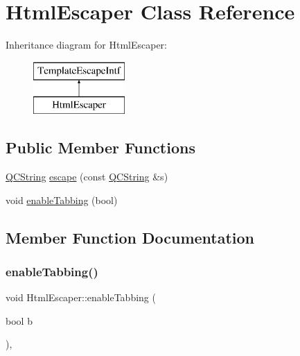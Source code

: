 \hypertarget{class_html_escaper}{}\section{Html\+Escaper Class Reference}
\label{class_html_escaper}
Inheritance diagram for Html\+Escaper\+:\begin{figure}[H]
\begin{center}
\leavevmode
\includegraphics[height=2.000000cm]{class_html_escaper}
\end{center}
\end{figure}
\subsection*{Public Member Functions}
\begin{DoxyCompactItemize}
\item 
\mbox{\hyperlink{class_q_c_string}{Q\+C\+String}} \mbox{\hyperlink{class_html_escaper_a9a3ca4fe8ec6faf9fa4edb2dc85e453c}{escape}} (const \mbox{\hyperlink{class_q_c_string}{Q\+C\+String}} \&s)
\item 
void \mbox{\hyperlink{class_html_escaper_adcf67addaab4c38dd6c8865986f1e0c5}{enable\+Tabbing}} (bool)
\end{DoxyCompactItemize}


\subsection{Member Function Documentation}
\mbox{\label{class_html_escaper_adcf67addaab4c38dd6c8865986f1e0c5}} 
\subsubsection{\texorpdfstring{enableTabbing()}{enableTabbing()}}
{\footnotesize\ttfamily void Html\+Escaper\+::enable\+Tabbing (\begin{DoxyParamCaption}\item[{bool}]{b }\end{DoxyParamCaption})\hspace{0.3cm}{\ttfamily [inline]}, {\ttfamily [virtual]}}

